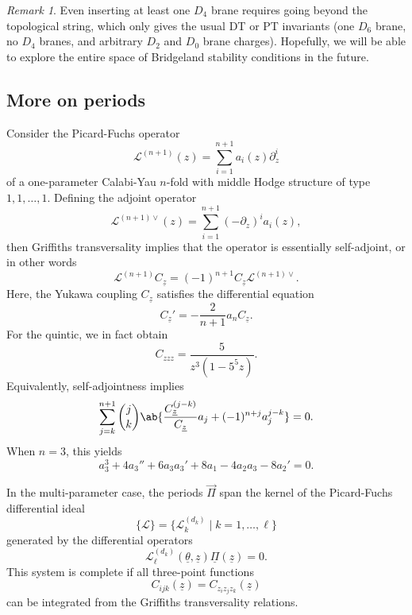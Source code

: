 \documentclass[10pt,oldfontcommands,oneside]{memoir}
\theoremstyle{definition}
\theoremstyle{remark}
\newtheorem{rmk}[thm]{Remark}
\theoremstyle{plain}
\theoremstyle{definition}
\theoremstyle{remark}
\newcommand{\mc}[1]{\mathcal{#1}}
\newcommand{\uz}{\ul{z}}
\newcommand{\ul}[1]{\underline{#1}}
\newcommand{\1}{\mathbf{1}}
\newcommand{\2}{\mathbf{2}}
\newcommand{\3}{\mathbf{3}}
\begin{document}
\begin{rmk}
    Even inserting at least one $D_4$ brane requires going beyond the topological string, which only gives the usual DT or PT invariants (one $D_6$ brane, no $D_4$ branes, and arbitrary $D_2$ and $D_0$ brane charges). Hopefully, we will be able to explore the entire space of Bridgeland stability conditions in the future.
\end{rmk}

\subsection{More on periods}%
\label{sub:More on periods}

Consider the Picard-Fuchs operator
\[ \mc{L}^{(n+1)}(z) = \sum_{i=1}^{n+1} a_i(z) \partial_z^i \]
of a one-parameter Calabi-Yau $n$-fold with middle Hodge structure of type $1,1,\ldots, 1$. Defining the adjoint operator
\[ \mc{L}^{(n+1)\vee}(z) = \sum_{i=1}^{n+1}(-\partial_z)^i a_i(z), \]
then Griffiths transversality implies that the operator is essentially self-adjoint, or in other words
\[ \mc{L}^{(n+1)} C_{\uz} = (-1)^{n+1} C_{\uz} \mc{L}^{(n+1)\vee}. \]
Here, the Yukawa coupling $C_{\uz}$ satisfies the differential equation
\[ C_{\uz}' = -\frac{2}{n+1} a_n C_{\uz}. \]
For the quintic, we in fact obtain
\[ C_{zzz}= \frac{5}{z^3(1-5^5z)}. \]
Equivalently, self-adjointness implies
\[ \sum_{j=k}^{n+1} \binom{j}{k} \ab\{ \frac{C_{\uz}^{(j-k)}}{C_{\uz}} a_j + (-1)^{n+j}a_j^{j-k}\} = 0. \]
When $n=3$, this yields
\[ a_3^3 + 4a_3'' + 6a_3 a_3' + 8 a_1 - 4 a_2a_3 - 8 a_2' = 0. \]

In the multi-parameter case, the periods $\vec{\Pi}$ span the kernel of the Picard-Fuchs differential ideal
\[ \{ \mc{L}\} = \{ \mc{L}_k^{(d_k)} \mid k = 1,\ldots,\ell\} \]
generated by the differential operators
\[ \mc{L}_{\ell}^{(d_k)}(\ul{\theta}, \uz) \ul{\Pi}(\uz) = 0. \]
This system is complete if all three-point functions
\[ C_{ijk}(\uz) = C_{z_iz_jz_k}(\uz) \]
can be integrated from the Griffiths transversality relations.
\end{document}
